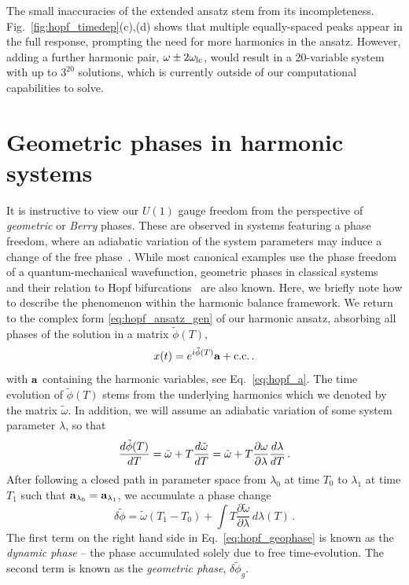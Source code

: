 The small inaccuracies of the extended ansatz stem from its incompleteness. Fig.~\ref{fig:hopf_timedep}(c),(d) shows that multiple equally-spaced peaks appear in the full response, prompting the need for more harmonics in the ansatz. 
However, adding a further harmonic pair, $\omega \pm 2 \omega_{\rm lc}$, would result in a 20-variable system with up to $3^{20}$ solutions, which is currently outside of our computational capabilities to solve. 


\section{Geometric phases in harmonic systems}

It is instructive to view our $U(1)$ gauge freedom from the perspective of \textit{geometric} or \textit{Berry} phases. These are observed in systems featuring a phase freedom, where an adiabatic variation of the system parameters may induce a change of the free phase~\cite{Cohen_2019, Berry_1988}. While most canonical examples use the phase freedom of a quantum-mechanical wavefunction, geometric phases in classical systems~\cite{Hannay_1985} and their relation to Hopf bifurcations~\cite{Ning_1992a, Ning_1992b} are also known. Here, we briefly note how to describe the phenomenon within the harmonic balance framework. We return to the complex form \eqref{eq:hopf_ansatz_gen} of our harmonic ansatz, absorbing all phases of the solution in a matrix $\tilde{\phi}(T)$, 
\begin{equation}
x(t) = e^{i \tilde{\phi}(T)} \vb{a} + \text{c.c.} \,.
\end{equation}
with $\vb{a}$ containing the harmonic variables, see Eq.~\eqref{eq:hopf_a}.
The time evolution of $\tilde{\phi}(T)$ stems from the underlying harmonics which we denoted by the matrix $\tilde{\omega}$. In addition, we will assume an adiabatic variation of some system parameter $\lambda$, so that
\begin{equation}
\frac{d \tilde{\phi}(T)}{d T} = \tilde{\omega} + T \frac{d \tilde{\omega}}{d T} = \tilde{\omega} + T \frac{\partial \omega}{\partial \lambda} \frac{d \lambda}{d T}\,.
\end{equation}
After following a closed path in parameter space from $\lambda_0$ at time $T_0$ to $\lambda_1$ at time $T_1$ such that $\vb{a}_{\lambda_0} = \vb{a}_{\lambda_1}$, we accumulate a phase change
\begin{equation} \label{eq:hopf_geophase}
\delta \tilde{\phi} = \tilde{\omega} \left(T_1-T_0 \right) +  \int T \frac{\partial \tilde{\omega}}{\partial \lambda} \, d\lambda(T)\,.
\end{equation}
The first term on the right hand side in Eq.~\eqref{eq:hopf_geophase} is known as the \textit{dynamic phase} -- the phase accumulated solely due to free time-evolution. The second term is known as the \textit{geometric phase}, $\delta \tilde{\phi}_g$.

